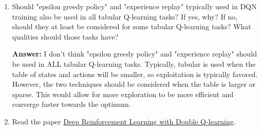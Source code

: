 \documentclass{assignment}
\begin{document}
\begin{problem}
\begin{enumerate}
\begin{enumerate}[label=(\alph*)]
\begin{enumerate}[label=\roman*.]
        \color{blue}
            \textbf{Temporal Difference Value:} $\delta = r + \gamma max_{a'} Q(s', a'; \theta) - Q(s, a; \theta) =  0 + 0.9 \times (1(11) + 1(3) + 2) - (1(15) + 1(3) + 2) = 0 + 0.9 \times 16 - 20 = 0 + 14.4 - 20 = -5.6$\\
            \textbf{Huber Loss:} First, determine which equation to use. $|y - Q(s, a; \theta)| = |0 + 0.9(1(11) + 1(3) + 2) - (1(15) + 1(3) + 2)| = |0 + 0.9(16) - 20| = |0 + 14.4 - 20| = |-5.6| = 5.6$, which $5.6 > 1$, so I will use the 2nd equation for Huber loss...\\
            $L(\theta) = \delta \times (|y - Q(s, a; \theta)| - \frac{1}{2}\delta) = 1 \times (5.6 - \frac{1}{2}(1)) = 5.6 - 0.5 = 5.1$
        \color{black}


        \end{enumerate}
    \end{enumerate}


    \item Should "epsilon greedy policy" and "experience replay" typically used in DQN training also be used in all tabular Q-learning tasks? If yes, why? If no, should they at least be considered for some tabular Q-learning tasks? What qualities should those tasks have?

    \color{blue}\textbf{Answer:} 
            I don't think "epsilon greedy policy" and "experience replay" should be used in ALL tabular Q-learning tasks. Typically, tabular is used when the table of states and actions will be smaller, so exploitation is typically favored. However, the two techniques should be considered when the table is larger or sparse. This would allow for more exploration to be more efficient and converge faster towards the optimum.
    \color{black}
    


    \item Read the paper \href{https://arxiv.org/pdf/1509.06461.pdf}{Deep Reinforcement Learning with Double Q-learning}.

    \begin{enumerate}[label=(\alph*)]


\end{enumerate}
\end{enumerate}
\end{problem}
\end{document}
